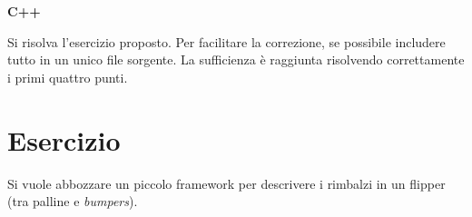 \documentclass[12pt,italian]{article}
\begin{document}
\clearpage


\begin{center}
{\large\bf C++}
\end{center}


Si risolva l'esercizio proposto.
Per facilitare la correzione, se possibile includere tutto in un unico file sorgente.
La sufficienza \`e raggiunta risolvendo correttamente
i primi quattro punti.



\section*{Esercizio}

Si vuole abbozzare un piccolo framework per descrivere i rimbalzi in un flipper
(tra palline e \emph{bumpers}).
\end{document}
